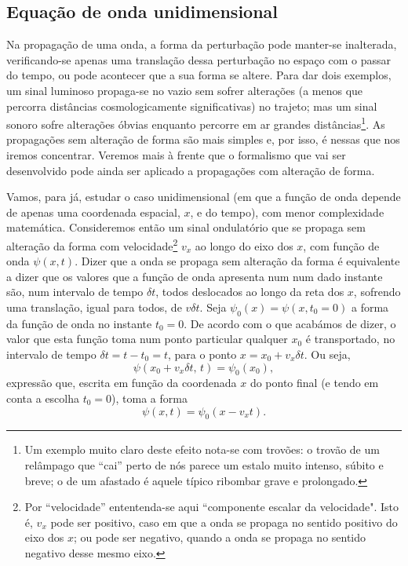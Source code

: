 \subsection{Equação de onda unidimensional}
Na propagação de uma onda, a forma da perturbação pode manter-se inalterada,
verificando-se apenas uma translação dessa perturbação no espaço com o passar do
tempo, ou pode acontecer que a sua forma se altere. Para dar dois exemplos, um
sinal luminoso propaga-se no vazio sem sofrer alterações (a menos que percorra
distâncias cosmologicamente significativas) no trajeto; mas um sinal sonoro
sofre alterações óbvias enquanto percorre em ar grandes distâncias\footnote{Um
exemplo muito claro deste efeito nota-se com trovões: o trovão de um relâmpago
que ``cai'' perto de nós parece um estalo muito intenso, súbito e breve; o de um
afastado é aquele típico ribombar grave e prolongado.}.  As propagações sem
alteração de forma são mais simples e, por isso, é nessas que nos iremos
concentrar. Veremos mais à frente que o formalismo que vai ser desenvolvido pode
ainda ser aplicado a propagações com alteração de forma. 

Vamos, para já, estudar o caso unidimensional (em que a função de onda depende
de apenas uma coordenada espacial, $x$, e do tempo), com menor complexidade
matemática. Consideremos então um sinal ondulatório que se propaga sem alteração
da forma com velocidade\footnote{Por ``velocidade'' ententenda-se aqui
``componente escalar da velocidade". Isto é, $v_x$ pode ser positivo, caso em
que a onda se propaga no sentido positivo do eixo dos $x$; ou pode ser negativo,
quando a onda se propaga no sentido negativo desse mesmo eixo.} $v_x$ ao longo
do eixo dos $x$, com função de onda $\psi(x,t)$. Dizer que a onda se propaga sem
alteração da forma é equivalente a dizer que os valores que a função de onda
apresenta num num dado instante são, num intervalo de tempo $\delta t$, todos
deslocados ao longo da reta dos $x$, sofrendo uma translação, igual para todos,
de $v\delta t$. Seja $\psi_0(x)=\psi(x,t_0=0)$ a forma da função de onda no
instante $t_0=0$. De acordo com o que acabámos de dizer, o valor que esta função
toma num ponto particular qualquer $x_0$ é transportado, no intervalo de tempo
$\delta t=t-t_0=t$, para o ponto $x=x_0+v_x\delta t$. Ou seja,
\begin{equation*}
  \psi(x_0+v_x\delta t,\,t)=\psi_0(x_0),
\end{equation*}
expressão que, escrita em função da coordenada $x$ do ponto final (e tendo em
conta a escolha $t_0=0$), toma a forma
\begin{equation}\label{eq:constformwave}
  \psi(x,t)=\psi_0(x-v_xt).
\end{equation}

